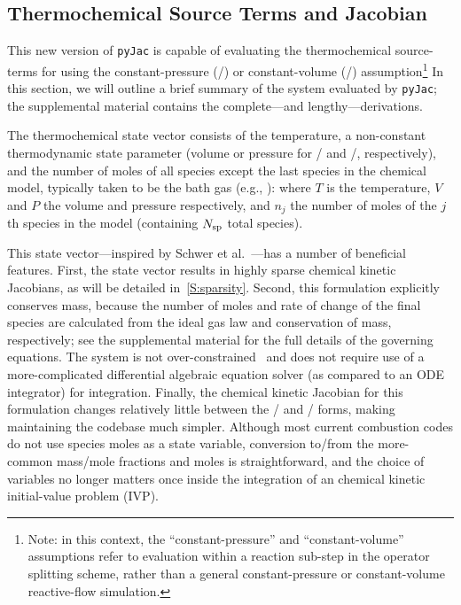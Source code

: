 \documentclass[12pt,number,sort&compress,preprint]{elsarticle}
\begin{document}
\subsection{Thermochemical Source Terms and Jacobian}
This new version of \texttt{pyJac} is capable of evaluating the thermochemical source-terms for using the constant-pressure (\conp/) or constant-volume (\conv/) assumption\footnote{Note: in this context, the ``constant-pressure'' and ``constant-volume'' assumptions refer to evaluation within a reaction sub-step in the operator splitting scheme, rather than a general constant-pressure or constant-volume reactive-flow simulation.}
In this section, we will outline a brief summary of the system evaluated by \texttt{pyJac}; the supplemental material contains the complete---and lengthy---derivations.


The thermochemical state vector consists of the temperature, a non-constant thermodynamic state parameter (volume or pressure for \conp/ and \conv/, respectively), and the number of moles of all species except the last species in the chemical model, typically taken to be the bath gas (e.g., ):
where $T$ is the temperature, $V$ and $P$ the volume and pressure respectively, and $n_j$ the number of moles of the $j$th species in the model (containing $\ns/$ total species).

This state vector---inspired by Schwer et al.~\cite{SCHWER2002270}---has a number of beneficial features.
First, the state vector results in highly sparse chemical kinetic Jacobians, as will be detailed in~\cref{S:sparsity}.
Second, this formulation explicitly conserves mass, because the number of moles and rate of change of the final species are calculated from the ideal gas law and conservation of mass, respectively; see the supplemental material for the full details of the governing equations.
The system is not over-constrained~\cite{HANSEN2018257} and does not require use of a more-complicated differential algebraic equation solver (as compared to an ODE integrator) for integration.
Finally, the chemical kinetic Jacobian for this formulation changes relatively little between the \conp/ and \conv/ forms, making maintaining the codebase much simpler.
Although most current combustion codes do not use species moles as a state variable, conversion to\slash from the more-common mass\slash mole fractions and moles is straightforward, and the choice of variables no longer matters once inside the integration of an chemical kinetic initial-value problem (IVP).
\end{document}
